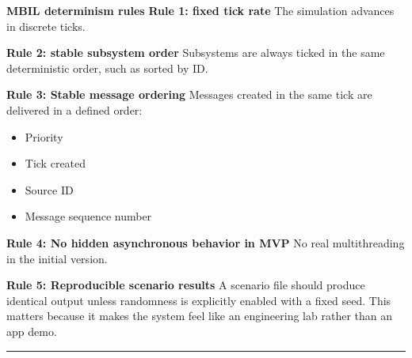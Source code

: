 \documentclass{report}
\begin{document}
\vspace{1\baselineskip}
\textbf{MBIL determinism rules}
\vspace{2\baselineskip}
\vspace{\baselineskip}\textbf{Rule 1: fixed tick rate}
\vspace{\baselineskip}\vspace{1\baselineskip}The simulation advances in discrete ticks. 

\noindent \textbf{Rule 2: stable subsystem order}
\vspace{\baselineskip}\vspace{1\baselineskip}Subsystems are always ticked in the same deterministic order, such as sorted by ID. 

\noindent \textbf{Rule 3: Stable message ordering}
\vspace{\baselineskip}\vspace{1\baselineskip}Messages created in the same tick are delivered in a defined order:
\begin{itemize}
   \item Priority 
   \item Tick created 
   \item Source ID 
   \item Message sequence number
\end{itemize}

\noindent \textbf{Rule 4: No hidden asynchronous behavior in MVP}
\vspace{\baselineskip}\vspace{1\baselineskip}No real multithreading in the initial version. 

\noindent \textbf{Rule 5: Reproducible scenario results}
\vspace{\baselineskip}\vspace{1\baselineskip}A scenario file should produce identical output unless randomness is explicitly enabled with a fixed seed.  
\vspace{\baselineskip}\vspace{1\baselineskip}This matters because it makes the system feel like an engineering lab rather than an app demo. 

\begin{center}
\rule{0.9\textwidth}{1pt}
\end{center}
\end{document}

